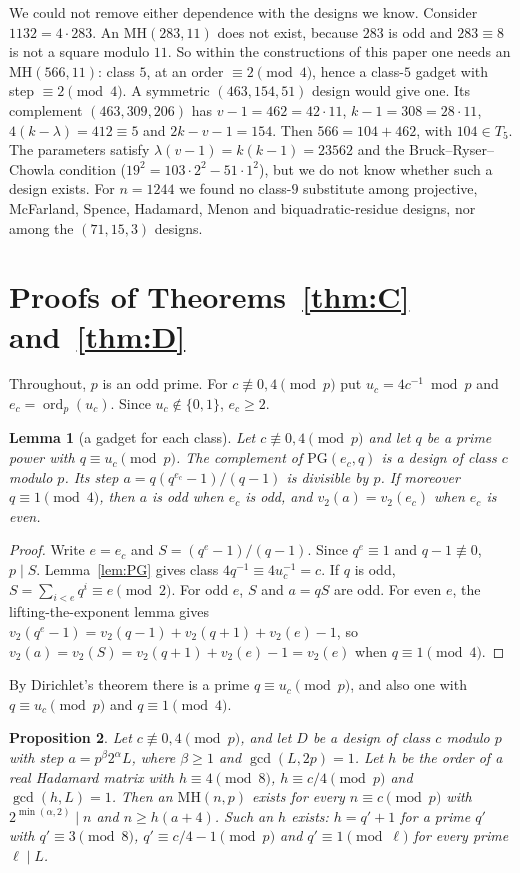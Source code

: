 \documentclass[10pt]{article}
\newtheorem{lemma}{Lemma}
\newtheorem{proposition}[lemma]{Proposition}
\theoremstyle{remark}
\newcommand{\MH}{\mathrm{MH}}
\newcommand{\ord}{\operatorname{ord}}
\newcommand{\PG}{\mathrm{PG}}
\begin{document}
We could not remove either dependence with the designs we know. Consider $1132=4\cdot283$. An $\MH(283,11)$ does not exist, because $283$ is odd and $283\equiv8$ is not a square modulo $11$. So within the constructions of this paper one needs an $\MH(566,11)$: class $5$, at an order $\equiv2\pmod4$, hence a class-$5$ gadget with step $\equiv2\pmod4$. A symmetric $(463,154,51)$ design would give one. Its complement $(463,309,206)$ has $v-1=462=42\cdot11$, $k-1=308=28\cdot11$, $4(k-\lambda)=412\equiv5$ and $2k-v-1=154$. Then $566=104+462$, with $104\in T_5$. The parameters satisfy $\lambda(v-1)=k(k-1)=23562$ and the Bruck--Ryser--Chowla condition ($19^2=103\cdot2^2-51\cdot1^2$), but we do not know whether such a design exists.
For $n=1244$ we found no class-$9$ substitute among projective, McFarland, Spence, Hadamard, Menon and biquadratic-residue designs, nor among the $(71,15,3)$ designs.

\section{Proofs of Theorems~\ref{thm:C} and~\ref{thm:D}}\label{sec:CD}
Throughout, $p$ is an odd prime. For $c\not\equiv0,4\pmod p$ put $u_c=4c^{-1}\bmod p$ and $e_c=\ord_p(u_c)$. Since $u_c\notin\{0,1\}$, $e_c\ge2$.

\begin{lemma}[a gadget for each class]\label{lem:classgadget}
Let $c\not\equiv0,4\pmod p$ and let $q$ be a prime power with $q\equiv u_c\pmod p$. The complement of $\PG(e_c,q)$ is a design of class $c$ modulo $p$. Its step $a=q(q^{e_c}-1)/(q-1)$ is divisible by $p$. If moreover $q\equiv1\pmod4$, then $a$ is odd when $e_c$ is odd, and $v_2(a)=v_2(e_c)$ when $e_c$ is even.
\end{lemma}

\begin{proof}
Write $e=e_c$ and $S=(q^e-1)/(q-1)$. Since $q^e\equiv1$ and $q-1\not\equiv0$, $p\mid S$. Lemma~\ref{lem:PG} gives class $4q^{-1}\equiv4u_c^{-1}=c$. If $q$ is odd, $S=\sum_{i<e}q^i\equiv e\pmod2$. For odd $e$, $S$ and $a=qS$ are odd. For even $e$, the lifting-the-exponent lemma gives $v_2(q^e-1)=v_2(q-1)+v_2(q+1)+v_2(e)-1$, so $v_2(a)=v_2(S)=v_2(q+1)+v_2(e)-1=v_2(e)$ when $q\equiv1\pmod4$.
\end{proof}

By Dirichlet's theorem there is a prime $q\equiv u_c\pmod p$, and also one with $q\equiv u_c\pmod p$ and $q\equiv1\pmod4$.

\begin{proposition}\label{prop:base}
Let $c\not\equiv0,4\pmod p$, and let $D$ be a design of class $c$ modulo $p$ with step $a=p^\beta2^\alpha L$, where $\beta\ge1$ and $\gcd(L,2p)=1$. Let $h$ be the order of a real Hadamard matrix with $h\equiv4\pmod8$, $h\equiv c/4\pmod p$ and $\gcd(h,L)=1$. Then an $\MH(n,p)$ exists for every $n\equiv c\pmod p$ with $2^{\min(\alpha,2)}\mid n$ and $n\ge h(a+4)$. Such an $h$ exists: $h=q'+1$ for a prime $q'$ with $q'\equiv3\pmod8$, $q'\equiv c/4-1\pmod p$ and $q'\equiv1\pmod\ell$ for every prime $\ell\mid L$.
\end{proposition}
\end{document}
